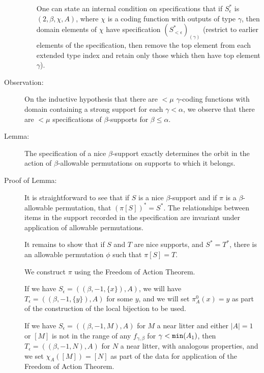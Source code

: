 \documentclass[112pt]{article}
\begin{document}
\begin{description}
\begin{enumerate}
One can state an internal condition on specifications that if $S^*_\epsilon$ is $(2,\beta,\chi,A)$, where $\chi$ is a coding function with outputs of type
$\gamma$, then domain elements of $\chi$ have specification $(S^*_{<\epsilon})_{(\gamma)}$ (restrict to earlier elements of the specification, then remove the top element from each extended type index and retain only those which then have top element $\gamma$).

\end{enumerate}

\begin{comment}

Peter wants a definition of the type specification independent of the type support.  Use tags.   It's a good idea.

\end{comment}

\item[Observation:]  On the inductive hypothesis that there are $<\mu$ $\gamma$-coding functions with domain containing a strong support for each $\gamma<\alpha$, we observe that there are $<\mu$ specifications of $\beta$-supports for $\beta\leq \alpha$.

\item[Lemma:]  The specification of a nice $\beta$-support exactly determines the orbit in the action of $\beta$-allowable permutations on supports to which it belongs.

\item[Proof of Lemma:]

It is straightforward to see that if $S$ is a nice $\beta$-support and if $\pi$ is a $\beta$-allowable permutation, that $(\pi[S])^* = S^*$.  The relationships between items in the support recorded in the specification are invariant under application of allowable permutations.

It remains to show that if $S$ and $T$ are nice supports, and $S^*=T^*$, there is an allowable permutation $\phi$ such that $\pi[S]=T$.

We construct $\pi$ using the Freedom of Action Theorem.

If we have $S_\epsilon = ((\beta,-1,\{x\}),A)$, we will have $T_\epsilon = ((\beta,-1,\{y\}),A)$ for some $y$, and we will set $\pi^0_A(x) = y$ as part of the construction of the local bijection to be used.

If we have $S_\epsilon = ((\beta,-1,M),A)$ for $M$ a near litter and either $|A|=1$ or $[M]$ is not in the range of any $f_{\gamma,\beta}$ for $\gamma<{\tt min}(A_1)$, then $T_\epsilon = ((\beta,-1,N),A)$ for $N$ a near litter, with analogous properties, and we set $\chi_A([M])=[N]$ as part of the data for application of the Freedom of Action Theorem.


\end{description}
\end{document}
